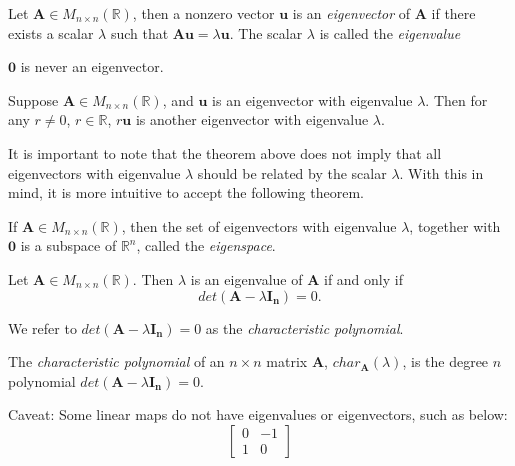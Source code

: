 \begin{definition}
Let $\bm{A}\in M_{n\times n}(\mathbb{R})$, then a nonzero vector $\bm{u}$ is an \emph{eigenvector} of $\bm{A}$ if there exists a scalar $\lambda$ such that $\bm{Au}=\lambda\bm{u}$. The scalar $\lambda$ is called the \emph{eigenvalue}
\end{definition}

$\bm{0}$ is never an eigenvector.

\begin{theorem}
Suppose $\bm{A}\in M_{n\times n}(\mathbb{R})$, and $\bm{u}$ is an eigenvector with eigenvalue $\lambda$. Then for any $r\neq 0$, $r\in\mathbb{R}$, $r\bm{u}$ is another eigenvector with eigenvalue $\lambda$.
\end{theorem}

It is important to note that the theorem above does not imply that all eigenvectors with eigenvalue $\lambda$ should be related by the scalar $\lambda$. With this in mind, it is more intuitive to accept the following theorem.

\begin{theorem}[Eigenspace]
If  $\bm{A}\in M_{n\times n}(\mathbb{R})$, then the set of eigenvectors with eigenvalue $\lambda$, together with $\bm{0}$ is a subspace of $\mathbb{R}^n$, called the \emph{eigenspace}.
\end{theorem}

\begin{theorem}
Let  $\bm{A}\in M_{n\times n}(\mathbb{R})$. Then $\lambda$ is an eigenvalue of $\bm{A}$ if and only if 
\begin{equation}
det(\bm{A}-\lambda\bm{I_n})=0.    
\end{equation}
\end{theorem}

We refer to $det(\bm{A}-\lambda\bm{I_n})=0$ as the \emph{characteristic polynomial}.

\begin{definition}
The \emph{characteristic polynomial} of an $n\times n$ matrix $\bm{A}$, $char_{\bm{A}}(\lambda)$, is the degree $n$ polynomial $det(\bm{A}-\lambda\bm{I_n})=0$.
\end{definition}

Caveat: Some linear maps do not have eigenvalues or eigenvectors, such as below:
$$\begin{bmatrix}0 & -1\\1 & 0\end{bmatrix}$$

